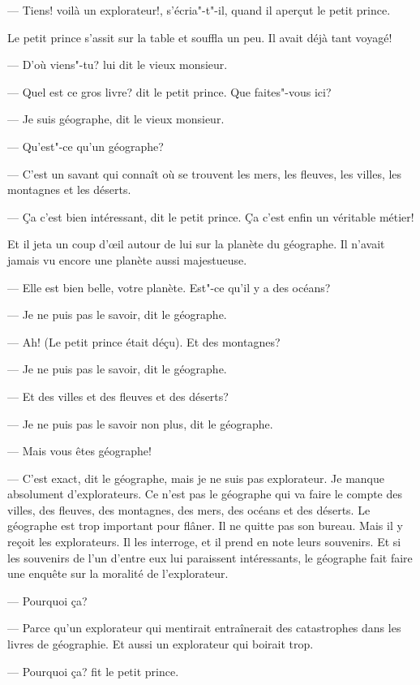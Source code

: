 \begin{Parallel}[p]{}{}
{--- Tiens! voilà un explorateur!, s'écria"-t"-il, quand
il aperçut le petit prince.

Le petit prince s'assit sur la table et souffla un
peu. Il avait déjà tant voyagé!

--- D'où viens"-tu? lui dit le vieux monsieur.

--- Quel est ce gros livre? dit le petit prince. Que
faites"-vous ici?

--- Je suis géographe, dit le vieux monsieur.

--- Qu'est"-ce qu'un géographe?

--- C'est un savant qui connaît où se trouvent les
mers, les fleuves, les villes, les montagnes et les
déserts.

--- Ça c'est bien intéressant, dit le petit prince. Ça
c'est enfin un véritable métier!

Et il jeta un coup d’œil autour de lui sur la planète du géographe. Il n'avait jamais vu encore une planète aussi majestueuse.

--- Elle est bien belle, votre planète. Est"-ce qu'il y a
des océans?

--- Je ne puis pas le savoir, dit le géographe.

--- Ah! (Le petit prince était déçu). Et des montagnes?

--- Je ne puis pas le savoir, dit le géographe.

--- Et des villes et des fleuves et des déserts?

--- Je ne puis pas le savoir non plus, dit le géographe.

--- Mais vous êtes géographe!

--- C'est exact, dit le géographe, mais je ne suis
pas explorateur. Je manque absolument d'explorateurs. Ce n'est pas le géographe qui va faire le
compte des villes, des fleuves, des montagnes, des mers, des océans et des déserts. Le géographe est
trop important pour flâner. Il ne quitte pas son
bureau. Mais il y reçoit les explorateurs. Il les interroge, et il prend en note leurs souvenirs. Et si les
souvenirs de l'un d'entre eux lui paraissent intéressants, le géographe fait faire une enquête sur la
moralité de l'explorateur.

--- Pourquoi ça?

--- Parce qu'un explorateur qui mentirait entraînerait des catastrophes dans les livres de géographie. Et aussi un explorateur qui boirait trop.

--- Pourquoi ça? fit le petit prince.

}
\end{Parallel}
